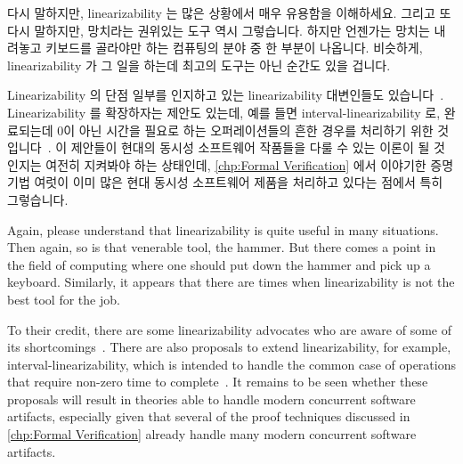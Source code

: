 \iffalse

It is often asserted that linearizability maps well to sequential
specifications, which are said to be more natural than are concurrent
specifications~\cite{SergioRajsbaum2020HistoryLinearizability}.
But this assertion fails to account for our highly concurrent objective
universe.
This universe can only be expected to select for ability to cope with
concurrency, especially for those participating in team sports or
overseeing small children.
In addition, given that the teaching of sequential
computing is still believed to be somewhat of a black
art~\cite{ElizabethPatitsas2020GradesNotBimodal}, it is reasonable
to expect that teaching of concurrent computing is in a similar state
of disarray.
Therefore, focusing on only one proof technique is unlikely to be a
good way forward.

\fi

다시 말하지만, linearizability 는 많은 상황에서 매우 유용함을 이해하세요.
그리고 또 다시 말하지만, 망치라는 권위있는 도구 역시 그렇습니다.
하지만 언젠가는 망치는 내려놓고 키보드를 골라야만 하는 컴퓨팅의 분야 중 한
부분이 나옵니다.
비슷하게, linearizability 가 그 일을 하는데 최고의 도구는 아닌 순간도 있을
겁니다.

Linearizability 의 단점 일부를 인지하고 있는 linearizability 대변인들도
있습니다~\cite{SergioRajsbaum2020HistoryLinearizability}.
Linearizability 를 확장하자는 제안도 있는데, 예를 들면 interval-linearizability
로, 완료되는데 0이 아닌 시간을 필요로 하는 오퍼레이션들의 흔한 경우를 처리하기
위한 것입니다~\cite{10.1145/3266457}.
이 제안들이 현대의 동시성 소프트웨어 작품들을 다룰 수 있는 이론이 될 것인지는
여전히 지켜봐야 하는 상태인데,
\cref{chp:Formal Verification} 에서 이야기한 증명 기법 여럿이 이미 많은 현대
동시성 소프트웨어 제품을 처리하고 있다는 점에서 특히 그렇습니다.

\iffalse

Again, please understand that linearizability is quite useful in many
situations.
Then again, so is that venerable tool, the hammer.
But there comes a point in the field of computing where one should put
down the hammer and pick up a keyboard.
Similarly, it appears that there are times when linearizability is not
the best tool for the job.

To their credit, there are some linearizability advocates who are aware
of some of its shortcomings~\cite{SergioRajsbaum2020HistoryLinearizability}.
There are also proposals to extend linearizability, for example,
interval-linearizability, which is intended to handle the common case
of operations that require non-zero time to
complete~\cite{10.1145/3266457}.
It remains to be seen whether these proposals will result in theories
able to handle modern concurrent software artifacts, especially given
that several of the proof techniques discussed in \cref{chp:Formal
Verification} already handle many modern concurrent software artifacts.

